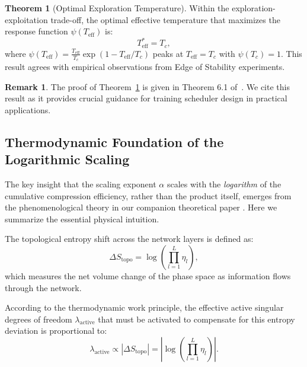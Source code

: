 \documentclass[11pt, a4paper]{article}
\theoremstyle{definition}
\newtheorem{theorem}{Theorem}[section]
\newtheorem{remark}{Remark}[section]
\begin{document}
\begin{theorem}[Optimal Exploration Temperature]
\label{thm:optimal-temp}
Within the exploration-exploitation trade-off, the optimal effective temperature that maximizes the response function $\psi(T_{\text{eff}})$ is:
\begin{equation}
    \boxed{T_{\text{eff}}^* = T_c},
\end{equation}
where $\psi(T_{\text{eff}}) = \frac{T_{\text{eff}}}{T_c}\exp(1 - T_{\text{eff}}/T_c)$ peaks at $T_{\text{eff}} = T_c$ with $\psi(T_c) = 1$. This result agrees with empirical observations from Edge of Stability experiments.
\end{theorem}

\begin{remark}
The proof of Theorem~\ref{thm:optimal-temp} is given in Theorem 6.1 of~\cite{liu2024unified}. We cite this result as it provides crucial guidance for training scheduler design in practical applications.
\end{remark}


\subsection{Thermodynamic Foundation of the Logarithmic Scaling}

The key insight that the scaling exponent $\alpha$ scales with the \emph{logarithm} of the cumulative compression efficiency, rather than the product itself, emerges from the phenomenological theory in our companion theoretical paper \cite{liu2024unified}. Here we summarize the essential physical intuition.

The topological entropy shift across the network layers is defined as:
\begin{equation}
\Delta S_{\text{topo}} = \log\left(\prod_{l=1}^{L} \eta_l\right),
\label{eq:topo_entropy_shift}
\end{equation}
which measures the net volume change of the phase space as information flows through the network.

According to the thermodynamic work principle, the effective active singular degrees of freedom $\lambda_{\text{active}}$ that must be activated to compensate for this entropy deviation is proportional to:
\begin{equation}
\lambda_{\text{active}} \propto |\Delta S_{\text{topo}}| = \left| \log\left(\prod_{l=1}^{L} \eta_l\right) \right|.
\label{eq:lambda_active}
\end{equation}
\end{document}
